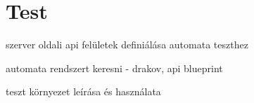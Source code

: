 \chapter{Test}
szerver oldali api felületek definiálása automata teszthez

automata rendszert keresni - drakov, api blueprint

teszt környezet leírása és használata